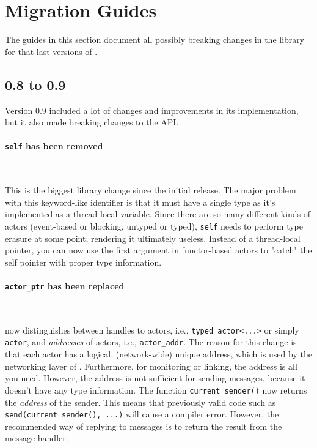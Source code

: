 \section{Migration Guides}

The guides in this section document all possibly breaking changes in the library for that last versions of \lib.

\subsection{0.8 to 0.9}

Version 0.9 included a lot of changes and improvements in its implementation, but it also made breaking changes to the API.

\paragraph{\lstinline^self^ has been removed}

~

This is the biggest library change since the initial release.
The major problem with this keyword-like identifier is that it must have a single type as it's implemented as a thread-local variable.
Since there are so many different kinds of actors (event-based or blocking, untyped or typed), \lstinline^self^ needs to perform type erasure at some point, rendering it ultimately useless.
Instead of a thread-local pointer, you can now use the first argument in functor-based actors to "catch" the self pointer with proper type information.

\paragraph{\lstinline^actor_ptr^ has been replaced}

~

\lib now distinguishes between handles to actors, i.e., \lstinline^typed_actor<...>^ or simply \lstinline^actor^, and \emph{addresses} of actors, i.e., \lstinline^actor_addr^. The reason for this change is that each actor has a logical, (network-wide) unique address, which is used by the networking layer of \lib. Furthermore, for monitoring or linking, the address is all you need. However, the address is not sufficient for sending messages, because it doesn't have any type information. The function \lstinline^current_sender()^ now returns the \emph{address} of the sender.
This means that previously valid code such as \lstinline^send(current_sender(), ...)^ will cause a compiler error.
However, the recommended way of replying to messages is to return the result from the message handler.

